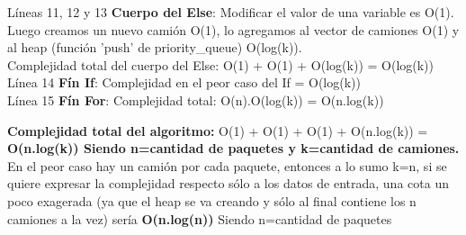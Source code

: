 Líneas 11, 12 y 13 \textbf{Cuerpo del Else}: Modificar el valor de una variable es O(1).\\
Luego creamos un nuevo camión O(1), lo agregamos al vector de camiones O(1) y al heap (función 'push' de priority\_queue) O(log(k)).\\
Complejidad total del cuerpo del Else: O(1) + O(1) + O(log(k)) = O(log(k))\\

Línea 14 \textbf{Fín If}: Complejidad en el peor caso del If = O(log(k))\\

Línea 15 \textbf{Fín For}: Complejidad total: O(n).O(log(k)) = O(n.log(k))\\

\begin{flushleft}
\textbf{Complejidad total del algoritmo:} O(1) + O(1) + O(1) + O(n.log(k)) = \textbf{O(n.log(k)) Siendo n=cantidad de paquetes y k=cantidad de camiones.}\\
En el peor caso hay un camión por cada paquete, entonces a lo sumo k=n, si se quiere expresar la complejidad respecto sólo a los datos de entrada, una cota un poco exagerada (ya que el heap se va creando y sólo al final contiene los n camiones a la vez) sería \textbf{O(n.log(n))} Siendo n=cantidad de paquetes\\
\end{flushleft}







